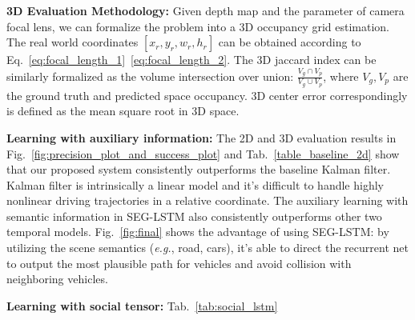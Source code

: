 \documentclass[10pt,twocolumn,letterpaper]{article}
\begin{document}
\vspace{\baselineskip}
\noindent \textbf{3D Evaluation Methodology:} Given depth map and the parameter of camera focal lens, we can formalize the problem into a 3D occupancy grid estimation. The real world coordinates $[x_r, y_r, w_r, h_r]$ can be obtained according to Eq.~\ref{eq:focal_length_1}~\ref{eq:focal_length_2}. The 3D jaccard index can be similarly formalized as the volume intersection over union: $\frac{V_g \cap V_p}{V_g \cup V_p}$, where $V_g, V_p$ are the ground truth and predicted space occupancy. 3D center error correspondingly is defined as the mean square root in 3D space.


\vspace{\baselineskip}
\noindent \textbf{Learning with auxiliary information:}
 The 2D and 3D evaluation results in Fig.~\ref{fig:precision_plot_and_success_plot} and Tab.~\ref{table_baseline_2d}  show that our proposed system consistently outperforms the baseline Kalman filter. Kalman filter is intrinsically a linear model and it's difficult to handle highly nonlinear driving trajectories in a relative coordinate.
 The auxiliary learning with semantic information in SEG-LSTM also consistently outperforms other two temporal models.
 Fig.~\ref{fig:final} shows the advantage of using SEG-LSTM: by utilizing the scene semantics (\emph{e.g.}, road, cars), it's able to direct the recurrent net to output the most plausible path for vehicles and avoid collision with neighboring vehicles.

\vspace{\baselineskip}
\noindent \textbf{Learning with social tensor:}
Tab.~\ref{tab:social_lstm}
\end{document}
